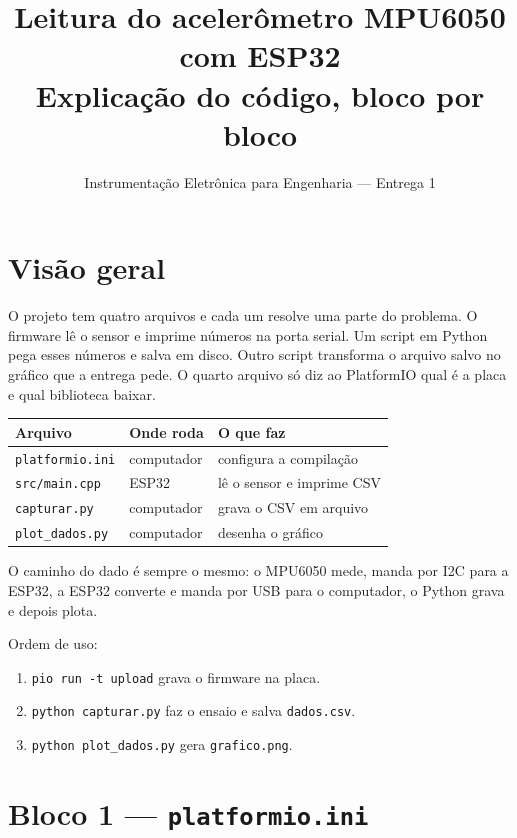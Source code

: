 \documentclass[11pt,a4paper]{article}
\title{Leitura do acelerômetro MPU6050 com ESP32\\[2mm]
       \large Explicação do código, bloco por bloco}
\author{Instrumentação Eletrônica para Engenharia --- Entrega 1}
\date{}
\begin{document}
\maketitle

\section*{Visão geral}

O projeto tem quatro arquivos e cada um resolve uma parte do problema. O
firmware lê o sensor e imprime números na porta serial. Um script em Python
pega esses números e salva em disco. Outro script transforma o arquivo salvo
no gráfico que a entrega pede. O quarto arquivo só diz ao PlatformIO qual é a
placa e qual biblioteca baixar.

\begin{center}
\begin{tabular}{@{}lll@{}}
\toprule
\textbf{Arquivo} & \textbf{Onde roda} & \textbf{O que faz} \\
\midrule
\texttt{platformio.ini} & computador  & configura a compilação \\
\texttt{src/main.cpp}   & ESP32       & lê o sensor e imprime CSV \\
\texttt{capturar.py}    & computador  & grava o CSV em arquivo \\
\texttt{plot\_dados.py} & computador  & desenha o gráfico \\
\bottomrule
\end{tabular}
\end{center}

O caminho do dado é sempre o mesmo: o MPU6050 mede, manda por I2C para a
ESP32, a ESP32 converte e manda por USB para o computador, o Python grava e
depois plota.

\vspace{3mm}
\noindent
Ordem de uso:

\begin{enumerate}
  \item \texttt{pio run -t upload} grava o firmware na placa.
  \item \texttt{python capturar.py} faz o ensaio e salva \texttt{dados.csv}.
  \item \texttt{python plot\_dados.py} gera \texttt{grafico.png}.
\end{enumerate}

\newpage
\section{Bloco 1 --- \texttt{platformio.ini}}
\end{document}
